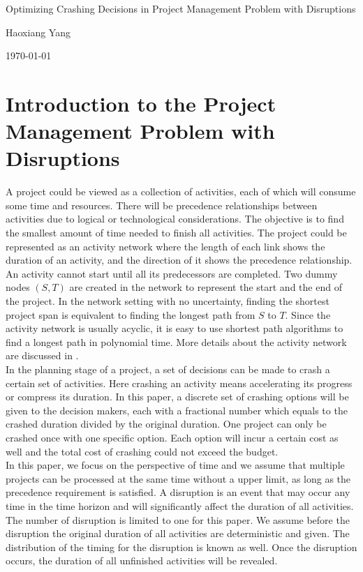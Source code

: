 \documentclass[11pt]{article}
\newcommand{\ms}{\medskip}
\begin{document}
\baselineskip0.25in

\begin{center}
\begin{large}
\begin{bf}

Optimizing Crashing Decisions in Project Management Problem with Disruptions \ms

Haoxiang Yang \ms

\today \ms
\end{bf}
\end{large}
\end{center}

\section{Introduction to the Project Management Problem with Disruptions}
A project could be viewed as a collection of activities, each of which will consume some time and resources. There will be precedence relationships between activities due to logical or technological considerations. The objective is to find the smallest amount of time needed to finish all activities. The project could be represented as an activity network where the length of each link shows the duration of an activity, and the direction of it shows the precedence relationship. An activity cannot start until all its predecessors are completed. Two dummy nodes \((S,T)\) are created in the network to represent the start and the end of the project. In the network setting with no uncertainty, finding the shortest project span is equivalent to finding the longest path from \(S\) to \(T\). Since the activity network is usually acyclic, it is easy to use shortest path algorithms to find a longest path in polynomial time. More details about the activity network are discussed in \cite{Elmaghraby77}.\\
\newline In the planning stage of a project, a set of decisions can be made to crash a certain set of activities. Here crashing an activity means accelerating its progress or compress its duration. In this paper, a discrete set of crashing options will be given to the decision makers, each with a fractional number which equals to the crashed duration divided by the original duration. One project can only be crashed once with one specific option. Each option will incur a certain cost as well and the total cost of crashing could not exceed the budget.\\
\newline In this paper, we focus on the perspective of time and we assume that multiple projects can be processed at the same time without a upper limit, as long as the precedence requirement is satisfied. A disruption is an event that may occur any time in the time horizon and will significantly affect the duration of all activities. The number of disruption is limited to one for this paper. We assume before the disruption the original duration of all activities are deterministic and given. The distribution of the timing for the disruption is known as well. Once the disruption occurs, the duration of all unfinished activities will be revealed.
\end{document}
